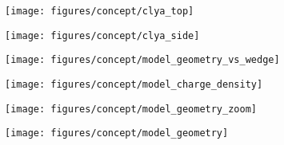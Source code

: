 \begin{figure*}[!bt]
  
	\centering
	\begin{minipage}[t]{5cm}
 		\begin{subfigure}[t]{5cm}
      \centering
      \caption{}\label{fig:clya_top}
      \vspace{-5mm}
      \texttt{[image: figures/concept/clya\_top]}
    \end{subfigure}
		\begin{subfigure}[t]{5cm}
			\centering
			\caption{}\label{fig:clya_side}
      \vspace{-5mm}
			\texttt{[image: figures/concept/clya\_side]}
		\end{subfigure}
	\end{minipage}
  \hspace{0.5cm}
  \begin{minipage}[t]{11.5cm}
    \begin{minipage}[t]{5.5cm}
      \begin{minipage}[t]{5.5cm}
        \begin{subfigure}[t]{1.6cm}
          \centering
          \caption{}\label{fig:model_geometry_vs_wedge}
          \vspace{-3mm}
          \texttt{[image: figures/concept/model\_geometry\_vs\_wedge]}
        \end{subfigure}
        \begin{subfigure}[t]{2.5cm}
          \centering
          \caption{}\label{fig:model_charge_density}
          \vspace{-3mm}
          \texttt{[image: figures/concept/model\_charge\_density]}
        \end{subfigure}
      \end{minipage}
      \begin{subfigure}[t]{5.5cm}
        \centering
        \vspace{0.5cm}
        \caption{}\label{fig:model_geometry_zoom}
        \vspace{-1cm}
        \texttt{[image: figures/concept/model\_geometry\_zoom]}
      \end{subfigure}
    \end{minipage}
    \hspace{-0.8cm}
    \begin{subfigure}[t]{5.5cm}
      \centering
      \caption{}\label{fig:model_geometry}
      \texttt{[image: figures/concept/model\_geometry]}
    \end{subfigure}
  \end{minipage}


\end{figure*}
